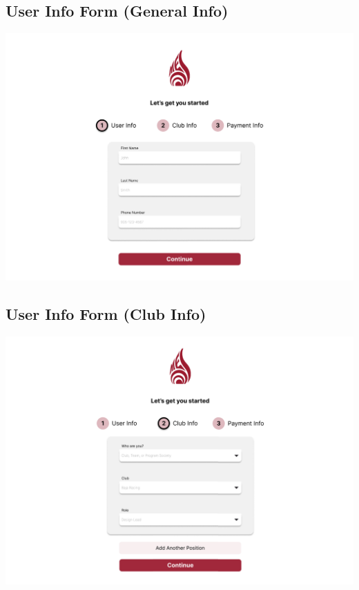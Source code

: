 \documentclass[12pt, titlepage]{article}
\begin{document}
\subsection{User Info Form (General Info)}
\includegraphics[]{imgs/UserInfoForm-GeneralInfo.png}

\subsection{User Info Form (Club Info)}
\includegraphics[]{imgs/UserInfoForm-ClubInfo.png}
\end{document}
